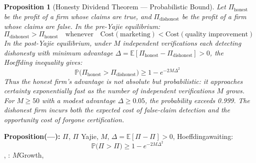 \documentclass[12pt,a4paper]{article}
\newtheorem{proposition}[theorem]{Proposition}
\theoremstyle{remark}
\newcommand{\E}{\mathbb{E}}
\newcommand{\Pbb}{\mathbb{P}}
\begin{document}
\subsection{}
\begin{proposition}[Honesty Dividend Theorem --- Probabilistic Bound]
Let $\Pi_{\text{honest}}$ be the profit of a firm whose claims are true, and 
$\Pi_{\text{dishonest}}$ be the profit of a firm whose claims are false. In the pre-Yajie 
equilibrium:
\begin{equation}
 \Pi_{\text{dishonest}} > \Pi_{\text{honest}} \quad \text{whenever} \quad 
 \text{Cost}(\text{marketing}) < \text{Cost}(\text{quality improvement})
\end{equation}
In the post-Yajie equilibrium, under $M$ independent verifications each detecting 
dishonesty with minimum advantage $\Delta = \E[\Pi_{\text{honest}} - \Pi_{\text{dishonest}}] > 0$, 
the Hoeffding inequality gives:
\begin{equation}
 \Pbb\!\big(\Pi_{\text{honest}} > \Pi_{\text{dishonest}}\big) \geq 1 - e^{-2M\Delta^{2}}
\end{equation}
Thus the honest firm's advantage is not absolute but \textit{probabilistic}: it approaches 
certainty exponentially fast as the number of independent verifications $M$ grows. For 
$M \geq 50$ with a modest advantage $\Delta \geq 0.05$, the probability exceeds 0.999.
The dishonest firm incurs both the expected cost of false-claim detection and the 
opportunity cost of forgone certification.
\end{proposition}
\medskip
\textbf{Proposition(---): }
$\Pi_{\text{}}$, $\Pi_{\text{}}$
Yajie, $M$, $\Delta = \E[\Pi_{\text{}} - \Pi_{\text{}}] > 0$, 
Hoeffdingawaiting: 
\begin{equation}
 \Pbb\!\big(\Pi_{\text{}} > \Pi_{\text{}}\big) \geq 1 - e^{-2M\Delta^{2}}
\end{equation}
, \textit{}: $M$Growth, 
\end{document}
